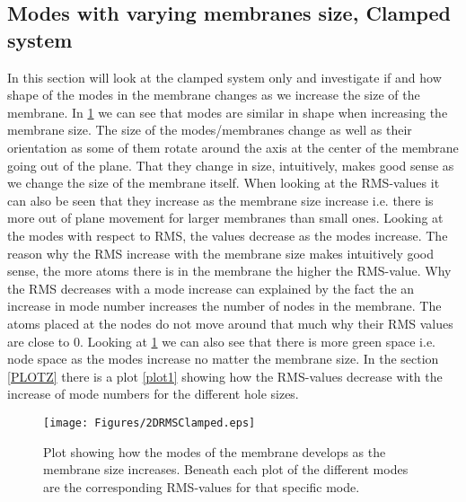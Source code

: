 \subsection{Modes with varying membranes size, Clamped system}In this section will look at the clamped system only and investigate if and how shape of the modes in the membrane changes as we increase the size of the membrane.
In \cref{BIG} we can see that modes are similar in shape when increasing the membrane size. The size of the modes/membranes change as well as their orientation as some of them rotate around the axis at the center of the membrane going out of the plane. That they change in size, intuitively, makes good sense as we change the size of the membrane itself. When looking at the RMS-values it can also be seen that they increase as the membrane size increase i.e. there is more out of plane movement for larger membranes than small ones. Looking at the modes with respect to RMS, the values decrease as the modes increase. The reason why the RMS increase with the membrane size makes intuitively good sense, the more atoms there is in the membrane the higher the RMS-value. Why the RMS decreases with a mode increase can explained by the fact the an increase in mode number increases the number of nodes in the membrane. The atoms placed at the nodes do not move around that much why their RMS values are close to 0. Looking at \cref{BIG} we can also see that there is more green space i.e. node space as the modes increase no matter the membrane size. In the section \cref{PLOTZ} there is a plot \cref{plot1} showing how the RMS-values decrease with the increase of mode numbers for the different hole sizes.
\onecolumngrid

 \begin{figure}[H]
     \centering
     \texttt{[image: Figures/2DRMSClamped.eps]}
     \caption{Plot showing how the modes of the membrane develops as the membrane size increases. Beneath each plot of the different modes are the corresponding RMS-values for that specific mode.
     }
     \label{BIG}
 \end{figure}
\twocolumngrid
